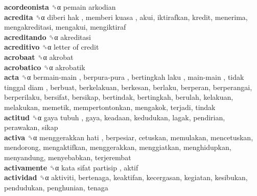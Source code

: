 \textbf{acordeonista} ␝α   pemain arkodian   \\
\textbf{acredita} ␝α   diberi hak ,  memberi kuasa , akui, iktirafkan, kredit, menerima, mengakreditasi, mengakui, mengiktiraf  \\
\textbf{acreditando} ␝α  akreditasi  \\
\textbf{acreditivo} ␝α   letter of credit   \\
\textbf{acrobaat} ␝α  akrobat  \\
\textbf{acrobatico} ␝α  akrobatik  \\
\textbf{acta} ␝α   bermain-main ,  berpura-pura ,  bertingkah laku ,  main-main ,  tidak tinggal diam , berbuat, berkelakuan, berkesan, berlaku, berperan, berperangai, berperilaku, bersifat, bersikap, bertindak, bertingkah, berulah, kelakuan, melakukan, memetik, mempertontonkan, mengakok, terjadi, tindak  \\
\textbf{actitud} ␝α   gaya tubuh , gaya, keadaan, kedudukan, lagak, pendirian, perawakan, sikap  \\
\textbf{activa} ␝α   menggerakkan hati , berpesiar, cetuskan, memulakan, mencetuskan, mendorong, mengaktifkan, menggerakkan, menggiatkan, menghidupkan, menyandung, menyebabkan, terjerembat  \\
\textbf{activamente} ␝α   kata sifat partisip , aktif  \\
\textbf{actividad} ␝α  aktiviti, bertenaga, keaktifan, kecergasan, kegiatan, kesibukan, pendudukan, penghunian, tenaga  \\
